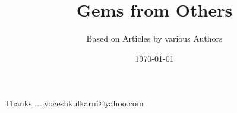 \documentclass[xcolor=dvipsnames,compress,t,pdf]{beamer}
\title[\hspace{4cm} \insertframenumber /\inserttotalframenumber]
{Gems from Others}
\subtitle[]{Based on Articles by various Authors}
\date[2020]{\today}
\begin{document}
\begin{frame}
\titlepage
\end{frame}






\begin{frame}[c]{}
Thanks ...
\vspace{5mm}
yogeshkulkarni@yahoo.com
\end{frame}
\end{document}
